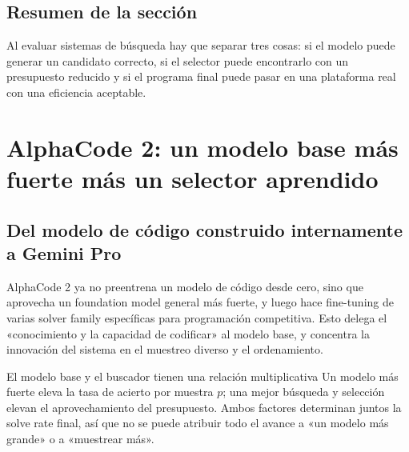 \documentclass[a4paper]{article}
\begin{document}

\subsection{Resumen de la sección}

Al evaluar sistemas de búsqueda hay que separar tres cosas: si el modelo puede generar un candidato correcto, si el selector puede encontrarlo con un presupuesto reducido y si el programa final puede pasar en una plataforma real con una eficiencia aceptable.

\section{AlphaCode 2: un modelo base más fuerte más un selector aprendido}

\subsection{Del modelo de código construido internamente a Gemini Pro}


AlphaCode 2 ya no preentrena un modelo de código desde cero, sino que aprovecha un foundation model general más fuerte, y luego hace fine-tuning de varias solver family específicas para programación competitiva. Esto delega el «conocimiento y la capacidad de codificar» al modelo base, y concentra la innovación del sistema en el muestreo diverso y el ordenamiento.


\begin{importantbox}{El modelo base y el buscador tienen una relación multiplicativa}
Un modelo más fuerte eleva la tasa de acierto por muestra $p$; una mejor búsqueda y selección elevan el aprovechamiento del presupuesto. Ambos factores determinan juntos la solve rate final, así que no se puede atribuir todo el avance a «un modelo más grande» o a «muestrear más».
\end{importantbox}
\end{document}
